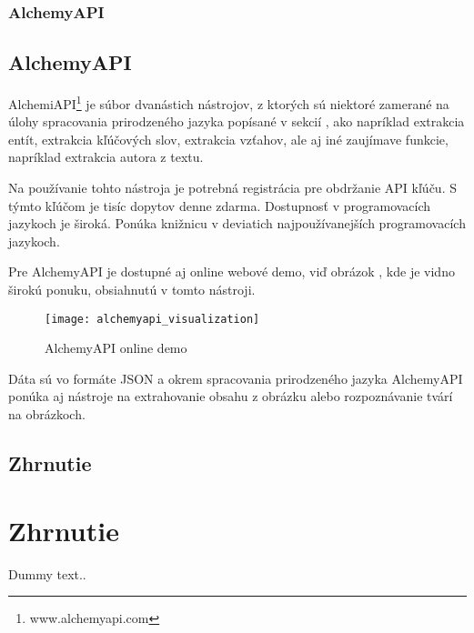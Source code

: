 %
%
{
	\subsubsection{AlchemyAPI}
}
{
	\subsection{AlchemyAPI}
}
\label{subsubsec:alchemyapi}
AlchemiAPI\footnote{www.alchemyapi.com} je súbor dvanástich nástrojov, z ktorých sú niektoré zamerané na úlohy spracovania prirodzeného jazyka popísané v sekcií , ako napríklad extrakcia entít, extrakcia kľúčových slov, extrakcia vzťahov, ale aj iné zaujímave funkcie, napríklad extrakcia autora z textu.

Na používanie tohto nástroja je potrebná registrácia pre obdržanie API kľúču. S týmto kľúčom je tisíc dopytov denne zdarma. Dostupnosť v programovacích jazykoch je široká. Ponúka knižnicu v deviatich najpoužívanejších programovacích jazykoch.

Pre AlchemyAPI je dostupné aj online webové demo, viď obrázok , kde je vidno širokú ponuku, obsiahnutú v tomto nástroji.

\begin{figure}[H]
\begin{center}\texttt{[image: alchemyapi\_visualization]}\end{center}
\caption[AlchemyAPI online demo]{AlchemyAPI online demo}\label{fig:alchemyapi_visualization}
\end{figure}

Dáta sú vo formáte JSON a okrem spracovania prirodzeného jazyka AlchemyAPI ponúka aj nástroje na extrahovanie obsahu z obrázku alebo rozpoznávanie tvárí na obrázkoch.

%
%
{
	\subsection{Zhrnutie}
}
{
	\section{Zhrnutie}
}
\label{subsec:analysis:zhrnutie}

Dummy text..